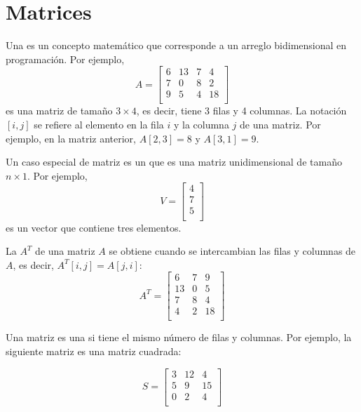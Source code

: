 \chapter{Matrices}


Una  es un concepto matemático
que corresponde a un arreglo bidimensional
en programación. Por ejemplo,
\[
A =
 \begin{bmatrix}
  6 & 13 & 7 & 4 \\
  7 & 0 & 8 & 2 \\
  9 & 5 & 4 & 18 \\
 \end{bmatrix}
\]
es una matriz de tamaño $3 \times 4$, es decir,
tiene 3 filas y 4 columnas.
La notación $[i,j]$ se refiere
al elemento en la fila $i$ y la columna $j$
de una matriz.
Por ejemplo, en la matriz anterior,
$A[2,3]=8$ y $A[3,1]=9$.


Un caso especial de matriz es un 
que es una matriz unidimensional de tamaño $n \times 1$.
Por ejemplo,
\[
V =
\begin{bmatrix}
4 \\
7 \\
5 \\
\end{bmatrix}
\]
es un vector que contiene tres elementos.


La  $A^T$ de una matriz $A$
se obtiene cuando se intercambian las filas y columnas de $A$,
es decir, $A^T[i,j]=A[j,i]$:
\[
A^T =
 \begin{bmatrix}
  6 & 7 & 9 \\
  13 & 0 & 5 \\
  7 & 8 & 4 \\
  4 & 2 & 18 \\
 \end{bmatrix}
\]


Una matriz es una  si
tiene el mismo número de filas y columnas.
Por ejemplo, la siguiente matriz es una
matriz cuadrada:

\[
S =
 \begin{bmatrix}
  3 & 12 & 4  \\
  5 & 9 & 15  \\
  0 & 2 & 4 \\
 \end{bmatrix}
\]

